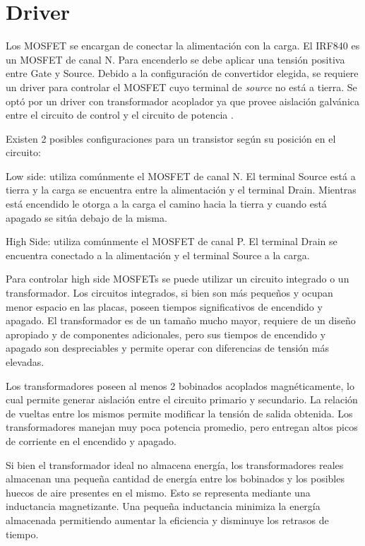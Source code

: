\section{Driver}

Los MOSFET se encargan de conectar la alimentación con la carga. El IRF840 es un MOSFET de canal N. 
Para encenderlo se debe aplicar una tensión positiva entre Gate y Source. 
Debido a la configuración de convertidor elegida, se requiere un driver para controlar el MOSFET cuyo terminal de \textit{source} no está a tierra. Se optó por un driver con transformador acoplador ya que provee aislación galvánica entre el circuito de control y el circuito de potencia \cite{gatedrivers}.

Existen 2 posibles configuraciones para un transistor según su posición en el circuito:

Low side: utiliza comúnmente el MOSFET de canal N. 
El terminal Source está a tierra y la carga se encuentra entre la alimentación y el terminal Drain. 
Mientras está encendido le otorga a la carga el camino hacia la tierra y cuando está apagado se sitúa debajo de la misma. 

High Side: utiliza comúnmente el MOSFET de canal P. 
El terminal Drain se encuentra conectado a la alimentación y el terminal Source a la carga. 


Para controlar high side MOSFETs se puede utilizar un circuito integrado o un transformador. 
Los circuitos integrados, si bien son más pequeños y ocupan menor espacio en las placas, 
poseen tiempos significativos de encendido y apagado. 
El transformador es de un tamaño mucho mayor, requiere de un diseño apropiado y de componentes adicionales,
 pero sus tiempos de encendido y apagado son despreciables y permite operar con diferencias de tensión más elevadas.

Los transformadores poseen al menos 2 bobinados acoplados magnéticamente, 
lo cual permite generar aislación entre el circuito primario y secundario. 
La relación de vueltas entre los mismos permite modificar la tensión de salida obtenida. 
Los transformadores manejan muy poca potencia promedio, pero entregan altos picos de corriente en el encendido y apagado.

Si bien el transformador ideal no almacena energía, los transformadores reales 
almacenan una pequeña cantidad de energía entre los bobinados y los posibles huecos de aire presentes en el mismo. 
Esto se representa mediante una inductancia magnetizante. 
Una pequeña inductancia minimiza la energía almacenada permitiendo aumentar la eficiencia y disminuye los retrasos de tiempo. 

